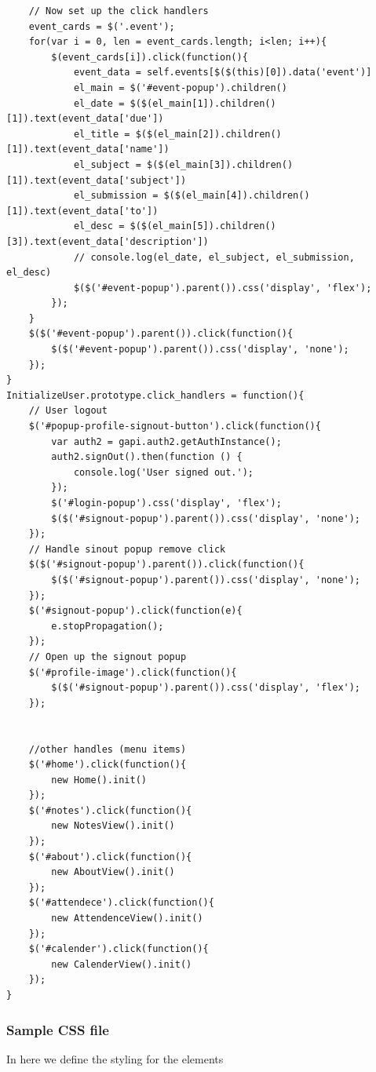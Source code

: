 \documentclass{article}
\begin{document}
\begin{lstlisting}
    // Now set up the click handlers
    event_cards = $('.event');
    for(var i = 0, len = event_cards.length; i<len; i++){
        $(event_cards[i]).click(function(){
            event_data = self.events[$($(this)[0]).data('event')]
            el_main = $('#event-popup').children()
            el_date = $($(el_main[1]).children()[1]).text(event_data['due'])
            el_title = $($(el_main[2]).children()[1]).text(event_data['name'])
            el_subject = $($(el_main[3]).children()[1]).text(event_data['subject'])
            el_submission = $($(el_main[4]).children()[1]).text(event_data['to'])
            el_desc = $($(el_main[5]).children()[3]).text(event_data['description'])
            // console.log(el_date, el_subject, el_submission, el_desc)
            $($('#event-popup').parent()).css('display', 'flex');
        });
    }
    $($('#event-popup').parent()).click(function(){
        $($('#event-popup').parent()).css('display', 'none');
    });
}
InitializeUser.prototype.click_handlers = function(){
    // User logout
    $('#popup-profile-signout-button').click(function(){
        var auth2 = gapi.auth2.getAuthInstance();
        auth2.signOut().then(function () {
            console.log('User signed out.');
        });
        $('#login-popup').css('display', 'flex');
        $($('#signout-popup').parent()).css('display', 'none');
    });
    // Handle sinout popup remove click
    $($('#signout-popup').parent()).click(function(){
        $($('#signout-popup').parent()).css('display', 'none');
    });
    $('#signout-popup').click(function(e){
        e.stopPropagation();
    });
    // Open up the signout popup
    $('#profile-image').click(function(){
        $($('#signout-popup').parent()).css('display', 'flex');
    });


    //other handles (menu items)
    $('#home').click(function(){
        new Home().init()
    });
    $('#notes').click(function(){
        new NotesView().init()
    });
    $('#about').click(function(){
        new AboutView().init()
    });
    $('#attendece').click(function(){
        new AttendenceView().init()
    });
    $('#calender').click(function(){
        new CalenderView().init()
    });
}
\end{lstlisting}

\subsubsection{Sample CSS file}
In here we define the styling for the elements
\vspace{1em}
\end{document}
